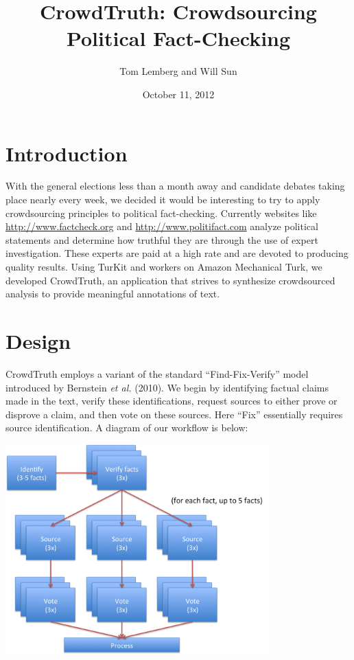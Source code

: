 \documentclass[10pt]{article}
\author{Tom Lemberg and Will Sun}
\title{CrowdTruth: Crowdsourcing Political Fact-Checking}
\date{October 11, 2012}
\begin{document}
\maketitle

\section{Introduction}

\noindent
With the general elections less than a month away and candidate debates taking place nearly every week, we decided it would be interesting to try to apply crowdsourcing principles to political fact-checking. Currently websites like \url{http://www.factcheck.org} and \url{http://www.politifact.com} analyze political statements and determine how truthful they are through the use of expert investigation. These experts are paid at a high rate and are devoted to producing quality results. Using TurKit and workers on Amazon Mechanical Turk, we developed CrowdTruth, an application that strives to synthesize crowdsourced analysis to provide meaningful annotations of text.

\section{Design}
\noindent
CrowdTruth employs a variant of the standard ``Find-Fix-Verify'' model introduced by Bernstein \emph{et al.} (2010). We begin by identifying factual claims made in the text, verify these identifications, request sources to either prove or disprove a claim, and then vote on these sources. Here ``Fix'' essentially requires source identification. A diagram of our workflow is below: \\

\begin{center}
\includegraphics[width=4in]{flow.png}
\end{center}
\end{document}
